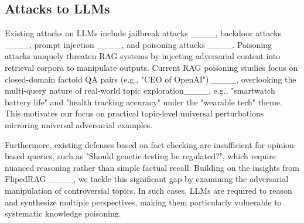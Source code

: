 \subsection{Attacks to LLMs}

Existing attacks on LLMs include jailbreak attacks ____, backdoor attacks ____, prompt injection ____, and poisoning attacks ____. Poisoning attacks uniquely threaten RAG systems by injecting adversarial content into retrieval corpora to manipulate outputs. Current RAG poisoning studies focus on closed-domain factoid QA pairs (e.g., "CEO of OpenAI") ____, overlooking the multi-query nature of real-world topic exploration____, e.g., "smartwatch battery life" and "health tracking accuracy" under the "wearable tech" theme. This motivates our focus on practical topic-level universal perturbations mirroring universal adversarial examples.

Furthermore, existing defenses based on fact-checking are insufficient for opinion-based queries, such as "Should genetic testing be regulated?", which require nuanced reasoning rather than simple factual recall. Building on the insights from FlipedRAG ____, we tackle this significant gap by examining the adversarial manipulation of controversial topics. In such cases, LLMs are required to reason and synthesize multiple perspectives, making them particularly vulnerable to systematic knowledge poisoning.